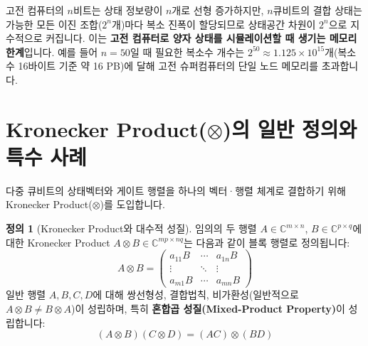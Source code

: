 \documentclass[11pt, a4paper]{article}
\theoremstyle{definition}
\newtheorem{definition}{정의}[section]
\begin{document}
고전 컴퓨터의 $n$비트는 상태 정보량이 $n$개로 선형 증가하지만, $n$큐비트의 결합 상태는 가능한 모든 이진 조합($2^n$개)마다 복소 진폭이 할당되므로 상태공간 차원이 $2^n$으로 지수적으로 커집니다. 이는 \textbf{고전 컴퓨터로 양자 상태를 시뮬레이션할 때 생기는 메모리 한계}입니다. 예를 들어 $n=50$일 때 필요한 복소수 개수는 $2^{50} \approx 1.125 \times 10^{15}$개(복소수 16바이트 기준 약 16 PB)에 달해 고전 슈퍼컴퓨터의 단일 노드 메모리를 초과합니다.

\section{Kronecker Product(\texorpdfstring{$\otimes$}{otimes})의 일반 정의와 특수 사례}
다중 큐비트의 상태벡터와 게이트 행렬을 하나의 벡터·행렬 체계로 결합하기 위해 Kronecker Product($\otimes$)를 도입합니다.

\begin{definition}[Kronecker Product와 대수적 성질]
임의의 두 행렬 $A \in \mathbb{C}^{m \times n}$, $B \in \mathbb{C}^{p \times q}$에 대한 Kronecker Product $A \otimes B \in \mathbb{C}^{mp \times nq}$는 다음과 같이 블록 행렬로 정의됩니다:
$$A \otimes B = \begin{pmatrix} a_{11}B & \cdots & a_{1n}B \\ \vdots & \ddots & \vdots \\ a_{m1}B & \cdots & a_{mn}B \end{pmatrix}$$
일반 행렬 $A, B, C, D$에 대해 쌍선형성, 결합법칙, 비가환성(일반적으로 $A \otimes B \neq B \otimes A$)이 성립하며, 특히 \textbf{혼합곱 성질(Mixed-Product Property)}이 성립합니다:
$$(A \otimes B)(C \otimes D) = (AC) \otimes (BD)$$
\end{definition}
\end{document}
